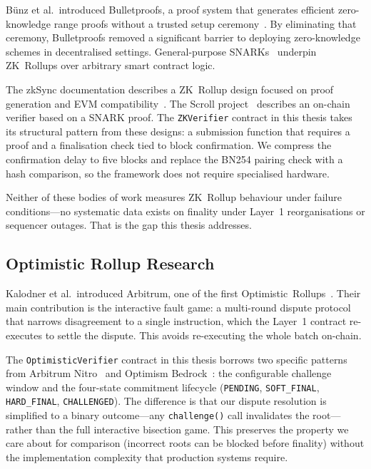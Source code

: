 Bünz et al.\ introduced Bulletproofs, a proof system that generates efficient zero-knowledge range proofs without a trusted setup ceremony~\cite{zk-efficient-proofs}. By eliminating that ceremony, Bulletproofs removed a significant barrier to deploying zero-knowledge schemes in decentralised settings. General-purpose SNARKs~\cite{groth2016size} underpin ZK~Rollups over arbitrary smart contract logic.

The zkSync documentation describes a ZK~Rollup design focused on proof generation and EVM compatibility~\cite{zksync-paper}. The Scroll project~\cite{scroll2023} describes an on-chain verifier based on a SNARK proof. The \texttt{ZKVerifier} contract in this thesis takes its structural pattern from these designs: a submission function that requires a proof and a finalisation check tied to block confirmation. We compress the confirmation delay to five blocks and replace the BN254 pairing check with a hash comparison, so the framework does not require specialised hardware.

Neither of these bodies of work measures ZK~Rollup behaviour under failure conditions---no systematic data exists on finality under Layer~1 reorganisations or sequencer outages. That is the gap this thesis addresses.

\subsection{Optimistic Rollup Research}

Kalodner et al.\ introduced Arbitrum, one of the first Optimistic~Rollups~\cite{arbitrum-original}. Their main contribution is the interactive fault game: a multi-round dispute protocol that narrows disagreement to a single instruction, which the Layer~1 contract re-executes to settle the dispute. This avoids re-executing the whole batch on-chain.

The \texttt{OptimisticVerifier} contract in this thesis borrows two specific patterns from Arbitrum Nitro~\cite{nitro2023} and Optimism Bedrock~\cite{optimism2023bedrock}: the configurable challenge window and the four-state commitment lifecycle (\texttt{PENDING}, \texttt{SOFT\_FINAL}, \texttt{HARD\_FINAL}, \texttt{CHALLENGED}). The difference is that our dispute resolution is simplified to a binary outcome---any \texttt{challenge()} call invalidates the root---rather than the full interactive bisection game. This preserves the property we care about for comparison (incorrect roots can be blocked before finality) without the implementation complexity that production systems require.

